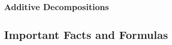 \subsubsection{Additive Decompositions}


\subsection{Important Facts and Formulas}






\begin{comment}
Explain what happens to the eigenvalues when we do certain things to a matrix (shifts, etc.)
I have a list of that in some text file. Shifting eigenvalues and manipulating them in other ways
can be important to improve convergence of numerical algrithms

Other possibly relevant matrix types to mention:
https://en.wikipedia.org/wiki/Companion_matrix
https://en.wikipedia.org/wiki/Smith_normal_form

\end{comment}